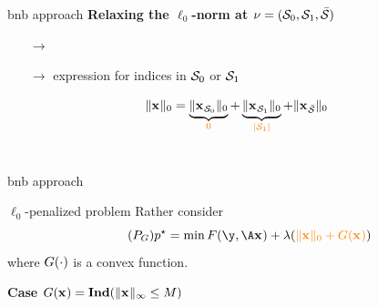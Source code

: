 \documentclass[10pt]{beamer}
\begin{document}
\begin{frame}{\gls{bnb} approach}
  \textbf{Relaxing the $\ell_0$-norm at $\nu=(\mathcal{S}_0,\mathcal{S}_1,\bar{\mathcal{S}})$} \\
  \pause
  \begin{itemize}
    \item[$\rightarrow$] 
    \pause
    \item[$\rightarrow$]  expression for indices in $\mathcal{S}_0$ or $\mathcal{S}_1$
  \end{itemize}
  \pause
  \begin{equation}
    \nonumber
    \norm{\pv}{0} = \underbrace{\norm{\subzero{\pv}}{0}}_{\emphone{0}} + \underbrace{\norm{\subone{\pv}}{0}}_{\emphone{\card{\setone}}} + \norm{\subnone{\pv}}{0}
  \end{equation}
  \vspace*{0.5cm}
  ~\\
  \pause
  
  \pause
  \vspace*{-0.5cm}
  \begin{center}
    \textbf{}
  \end{center}
\end{frame}

\begin{frame}{\gls{bnb} approach}
  \begin{center}
    \begin{minipage}{0.7\linewidth}
      \begin{block}{ $\ell_0$-penalized problem}
        Rather consider
        \begin{equation}
          \label{prob:prob-pertrbated} 
          \tag{\(\ppb_{\pertfunc}\)}
          \optobj = \min \datafunc(\obs,\dic\pv) + \reg (\emphone{\norm{\pv}{0} + \pertfunc(\pv)})
        \end{equation}
        where $G(\cdot)$ is a convex function.
      \end{block}
    \end{minipage}
  \end{center}
  \pause
  \vspace*{1cm}
  \begin{minipage}[t]{0.49\linewidth}
    \textbf{Case $\pertfunc(\pv)= \Icvx(\norm{\pv}{\infty} \leq \bigM)$} 
    \pause
    \vspace*{0.05cm}
    
  \end{minipage}
  \hfill
  \begin{minipage}[t]{0.49\linewidth}
  \end{minipage}
\end{frame}
\end{document}
